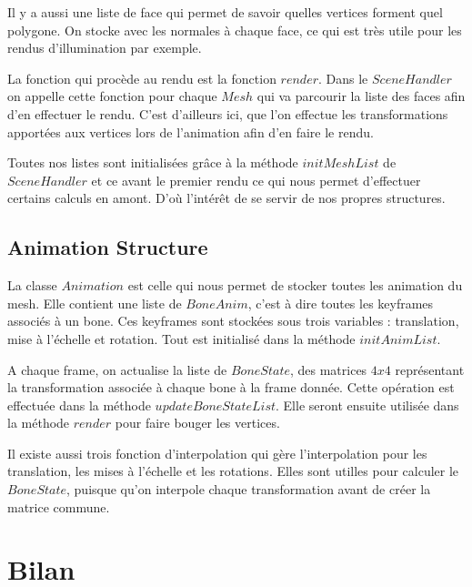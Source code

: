 \documentclass[a4paper]{report}
\begin{document}
\par
Il y a aussi une liste de face qui permet de savoir quelles vertices forment quel polygone. On stocke avec les normales à chaque face, ce qui est très utile pour les rendus d'illumination par exemple.

   

\par
La fonction qui procède au rendu est la fonction $render$. Dans le $SceneHandler$ on appelle cette fonction pour chaque $Mesh$ qui va parcourir la liste des faces afin d'en effectuer le rendu. C'est d'ailleurs ici, que l'on effectue les transformations apportées aux vertices lors de l'animation afin d'en faire le rendu.

\par
Toutes nos listes sont initialisées grâce à la méthode $initMeshList$ de $SceneHandler$ et ce avant le premier rendu ce qui nous permet d'effectuer certains calculs en amont. D'où l'intérêt de se servir de nos propres structures.

    \section{Animation Structure}

La classe $Animation$ est celle qui nous permet de stocker toutes les animation du mesh. Elle contient une liste de $BoneAnim$, c'est à dire toutes les keyframes associés à un bone. Ces keyframes sont stockées sous trois variables : translation, mise à l'échelle et rotation. Tout est initialisé dans la méthode $initAnimList$.

A chaque frame, on actualise la liste de $BoneState$, des matrices $4x4$ représentant la transformation associée à chaque bone à la frame donnée. Cette opération est effectuée dans la méthode $updateBoneStateList$. Elle seront ensuite utilisée dans la méthode $render$ pour faire bouger les vertices.

Il existe aussi trois fonction d'interpolation qui gère l'interpolation pour les translation, les mises à l'échelle et les rotations. Elles sont utilles pour calculer le $BoneState$, puisque qu'on interpole chaque transformation avant de créer la matrice commune.





\newpage
\chapter{Bilan}
\end{document}
